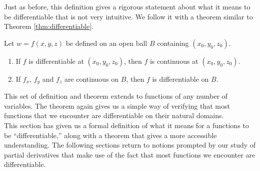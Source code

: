 Just as before, this definition gives a rigorous statement about what it means to be differentiable that is not very intuitive. We follow it with a theorem similar to Theorem \ref{thm:differentiable}.

{Let $w=f(x,y,z)$ be defined on an open ball $B$ containing $(x_0,y_0,z_0)$. 
\begin{enumerate}
\item	If $f$ is differentiable at $(x_0,y_0,z_0)$, then $f$ is continuous at $(x_0,y_0,z_0)$.
\item If $f_x$, $f_y$  and $f_z$ are continuous on $B$, then $f$ is differentiable on $B$.
\end{enumerate}
}

This set of definition and theorem extends to functions of any number of variables. The theorem again gives us a simple way of verifying that most functions that we encounter are differentiable on their natural domains.\\


This section has given us a formal definition of what it means for a functions to be ``differentiable,'' along with a theorem that gives a more accessible understanding. The following sections return to notions prompted by our study of partial derivatives that make use of the fact that most functions we encounter are differentiable.

